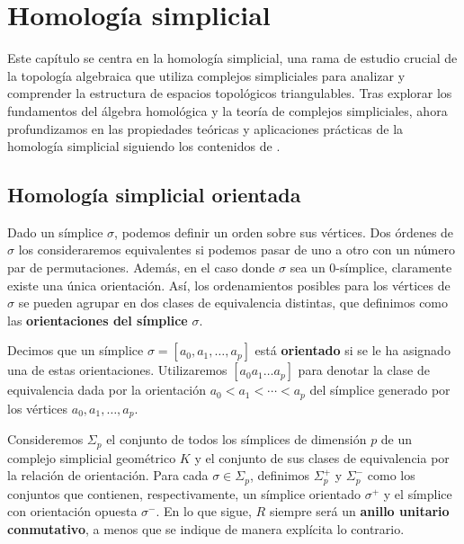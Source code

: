 
\chapter{Homología simplicial}
\label{chapter:homology}

Este capítulo se centra en la homología simplicial, una rama de estudio crucial
de la topología algebraica que utiliza complejos simpliciales para analizar y
comprender la estructura de espacios topológicos triangulables. Tras explorar los
fundamentos del álgebra homológica y la teoría de complejos simpliciales, ahora
profundizamos en las propiedades teóricas y aplicaciones prácticas de la
homología simplicial siguiendo los contenidos de \cite{rafael2003elementos}.

\section{Homología simplicial orientada}

Dado un símplice $\sigma$, podemos definir un orden sobre sus vértices. Dos
órdenes de $\sigma$ los consideraremos equivalentes si podemos pasar de uno a
otro con un número par de permutaciones. 
Además, en el caso donde $\sigma$ sea un $0$-símplice, claramente existe una única orientación.
Así, los ordenamientos posibles para
los vértices de $\sigma$ se pueden agrupar en dos clases de equivalencia
distintas, que definimos como las \textbf{orientaciones del símplice} $\sigma$.

\begin{definicion}
	Decimos que un símplice $\sigma = [a_{0}, a_{1}, \ldots, a_{p}]$ está \textbf{orientado}
	si se le ha asignado una de estas orientaciones. Utilizaremos $[a_{0}a_{1}\ldots
	a_{p}]$ para denotar la clase de equivalencia dada por la orientación $a_{0}< a
	_{1}< \cdots < a_{p}$ del símplice generado por los vértices $a_{0},a_{1},\ldots
	, a_{p}$.
\end{definicion}

Consideremos \(\Sigma_{p}\) el conjunto de todos los símplices de dimensión \(p\) de
un complejo simplicial geométrico \(K\) y el conjunto de sus clases de equivalencia por la relación de orientación. Para cada \(\sigma \in \Sigma_{p}\), definimos
\(\Sigma_{p}^{+}\) y \(\Sigma_{p}^{-}\) como los conjuntos que contienen, respectivamente,
un símplice orientado \(\sigma^{+}\) y el símplice con orientación opuesta
\(\sigma^{-}\). En lo que sigue, \(R\) siempre será un \textbf{anillo unitario conmutativo}, a menos que se indique de manera explícita lo contrario.

